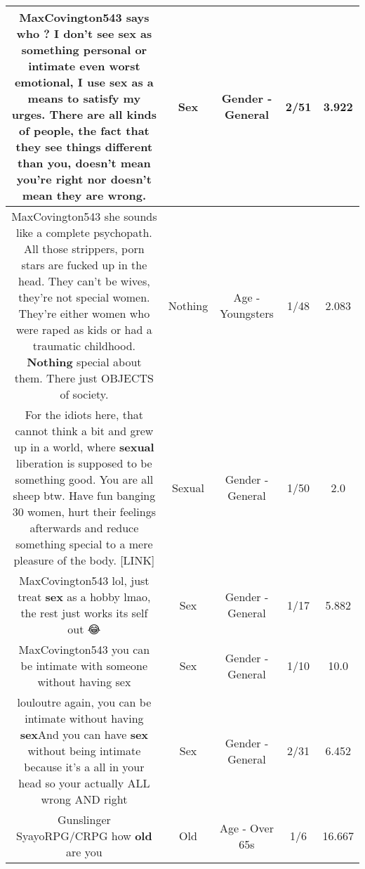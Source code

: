 \documentclass[11pt]{article}
\newlength\mylength
\begin{document}
\begin{center}
\begin{longtable}{|C{.65\mylength}|C{.30\mylength}|C{.12\mylength}|C{.12\mylength}|C{.12\mylength}|}
  \small MaxCovington543 says who ? I don't see \textbf{sex} as something personal or intimate even worst emotional, I use \textbf{sex} as a means to satisfy my urges. There are all kinds of people, the fact that they see things different than you, doesn't mean you're right nor doesn't mean they are wrong.\normalsize   & Sex & Gender - General & 2/51 & 3.922 \\  \hline
  \small MaxCovington543 she sounds like a complete psychopath. All those strippers, porn stars are fucked up in the head. They can't be wives, they're not special women. They're either women who were raped as kids or had a traumatic childhood. \textbf{Nothing} special about them. There just OBJECTS of society.\normalsize   & Nothing & Age - Youngsters & 1/48 & 2.083 \\  \hline
  \small For the idiots here, that cannot think a bit and grew up in a world, where \textbf{sexual} liberation is supposed to be something good. You are all sheep btw. Have fun banging 30 women, hurt their feelings afterwards and reduce something special to a mere pleasure of the body. [LINK] \normalsize   & Sexual & Gender - General & 1/50 & 2.0 \\  \hline
  \small MaxCovington543 lol, just treat \textbf{sex} as a hobby lmao, the rest just works its self out 😂\normalsize   & Sex & Gender - General & 1/17 & 5.882 \\  \hline
  \small MaxCovington543 you can be intimate with someone without having sex\normalsize   & Sex & Gender - General & 1/10 & 10.0 \\  \hline
  \small louloutre again, you can be intimate without having \textbf{sex}And you can have \textbf{sex} without being intimate because it's a all in your head so your actually ALL wrong AND right\normalsize   & Sex & Gender - General & 2/31 & 6.452 \\  \hline
  \small Gunslinger SyayoRPG/CRPG how \textbf{old} are you\normalsize   & Old & Age - Over 65s & 1/6 & 16.667 \\  \hline

\end{longtable}
\end{center}
\end{document}
